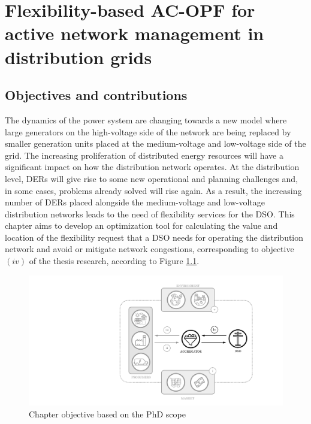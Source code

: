\chapter{Flexibility-based AC-OPF for active network management in distribution grids}
\label{ChapterOPFDSO}

\section{Objectives and contributions}

The dynamics of the power system are changing towards a new model where large generators on the high-voltage side of the network are being replaced by smaller generation units placed at the medium-voltage and low-voltage side of the grid. The increasing proliferation of distributed energy resources will have a significant impact on how the distribution network operates. At the distribution level, DERs will give rise to some new operational and planning challenges and, in some cases, problems already solved will rise again. As a result, the increasing number of DERs placed alongside the medium-voltage  and low-voltage distribution networks leads to the need of flexibility services for the DSO. 
This chapter aims to develop an optimization tool for calculating the value and location of the flexibility request that a DSO needs for operating the distribution network and avoid or mitigate network congestions, corresponding to objective $(iv)$ of the thesis research, according to Figure \ref{fig:chapter_obj_iv}. 

\begin{figure}[htbp]
	\centering
	\includegraphics[width=0.7\columnwidth ]{ChapterOPF_DSO/Figures/phd_intro_iv.pdf}
		\caption{Chapter objective based on the PhD scope}
	\label{fig:chapter_obj_iv}  
\end{figure}


